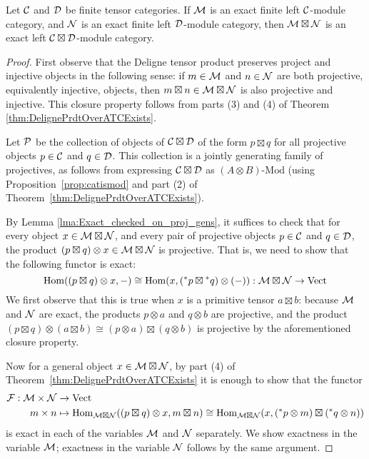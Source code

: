 \documentclass{amsart}
\begin{document}
\begin{theorem}\label{thm:tensor-exactness}
Let $\mathcal C$ and $\mathcal D$ be finite tensor categories.  If $\mathcal M$ is an exact finite left $\mathcal C$-module category, and $\mathcal N$ is an exact finite left $\mathcal D$-module category, then $\mathcal M \boxtimes \mathcal N$ is an exact left $\mathcal C \boxtimes \mathcal D$-module category.
\end{theorem}

\begin{proof} 
First observe that the Deligne tensor product preserves project and injective objects in the following sense: if $m \in \mathcal M$ and $n \in \mathcal N$ are both projective, equivalently injective, objects, then $m \boxtimes n \in \mathcal M \boxtimes \mathcal N$ is also projective and injective.  This closure property follows from parts (3) and (4) of Theorem \ref{thm:DelignePrdtOverATCExists}.

Let $\mathcal P$ be the collection of objects of $\mathcal C \boxtimes \mathcal D$ of the form $p \boxtimes q$ for all projective objects $p \in \mathcal C$ and $q \in \mathcal D$.  This collection is a jointly generating family of projectives, as follows from expressing $\mathcal C \boxtimes \mathcal D$ as $(A \otimes B)\textrm{-}\mathrm{Mod}$ (using Proposition~\ref{prop:catismod} and part (2) of Theorem~\ref{thm:DelignePrdtOverATCExists}).

By Lemma \ref{lma:Exact_checked_on_proj_gens}, it suffices to check that for every object $x \in \mathcal M \boxtimes \mathcal N$, and every pair of projective objects $p \in \mathcal C$ and $q \in \mathcal D$, the product $(p \boxtimes q) \otimes x \in \mathcal M \boxtimes \mathcal N$ is projective.  That is, we need to show that the following functor is exact:
\begin{equation*}
	\operatorname{Hom}((p \boxtimes q) \otimes x, -) \cong \operatorname{Hom}(x, ({}^*p \boxtimes {}^*q) \otimes(-) ): \mathcal M \boxtimes \mathcal N \to \mathrm{Vect}
\end{equation*}
We first observe that this is true when $x$ is a primitive tensor $a \boxtimes b$: because $\mathcal M$ and $\mathcal N$ are exact, the products $p \otimes a$ and $q \otimes b$ are projective, and the product $(p \boxtimes q) \otimes (a \boxtimes b) \cong (p \otimes a) \boxtimes (q \otimes b)$ is projective by the aforementioned closure property.

Now for a general object $x \in \mathcal M \boxtimes \mathcal N$, by part (4) of Theorem~\ref{thm:DelignePrdtOverATCExists} it is enough to show that the functor
\begin{align*}
\mathcal F: \mathcal M \times \mathcal N &\rightarrow \mathrm{Vect} \\
m \times n &\mapsto \operatorname{Hom}_{\mathcal M \boxtimes \mathcal N}((p \boxtimes q) \otimes x, m \boxtimes n) \cong \operatorname{Hom}_{\mathcal M \boxtimes \mathcal N}(x, ({}^* p \otimes m) \boxtimes ({}^* q \otimes n))
\end{align*}
is exact in each of the variables $\mathcal M$ and $\mathcal N$ separately.  We show exactness in the variable $\mathcal M$; exactness in the variable $\mathcal N$ follows by the same argument.


\end{proof}
\end{document}
